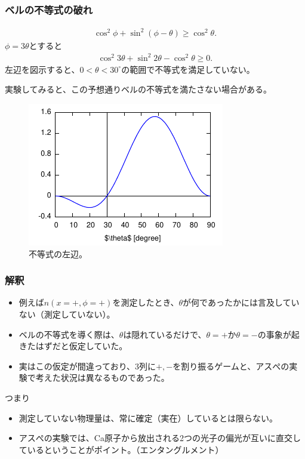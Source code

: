 \documentclass[10pt,b5paper,papersize,dvipdfmx]{jsbook}
\begin{document}
%
\subsubsection{ベルの不等式の破れ} %

\begin{align*}
  \cos^2\phi + \sin^2(\phi - \theta) \ge \cos^2\theta.
\end{align*}
$\phi = 3\theta$とすると
\begin{align*}
  \cos^2 3\theta + \sin^2 2\theta - \cos^2\theta \ge 0.
\end{align*}
左辺を図示すると、$0 < \theta < 30^\circ$の範囲で不等式を満足していない。

実験してみると、この予想通りベルの不等式を満たさない場合がある。

\begin{figure}[htp]
  \centering
  \includegraphics{nkym/fig/Aspect.pdf}
  \caption{不等式の左辺。}
\end{figure}

\subsubsection{解釈}

\begin{itemize}
  \item 例えば$n(x=+,\phi=+)$を測定したとき、$\theta$が何であったかには言及していない（測定していない）。
  \item ベルの不等式を導く際は、$\theta$は隠れているだけで、$\theta=+$か$\theta=-$の事象が起きたはずだと仮定していた。
  \item 実はこの仮定が間違っており、3列に$+,-$を割り振るゲームと、アスぺの実験で考えた状況は異なるものであった。
\end{itemize}

つまり

\begin{itemize}
  \item 測定していない物理量は、常に確定（実在）しているとは限らない。
  \item アスぺの実験では、Ca原子から放出される2つの光子の偏光が互いに直交しているということがポイント。（エンタングルメント）
\end{itemize}
\end{document}
